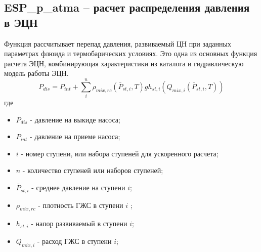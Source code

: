 \subsection{ESP\_p\_atma – расчет распределения давления в ЭЦН}
Функция рассчитывает перепад давления, развиваемый ЦН при заданных параметрах флюида и термобарических условиях. Это одна из основных функция расчета ЭЦН, комбинирующая характеристики из каталога и гидравлическую модель работы ЭЦН.
$$ P_{dis} = P_{int} + \sum_i^n{\rho_{mix,rc}(\bar{P}_{st,i},T) g h_{st,i}(Q_{mix,i}(\bar{P}_{st,i},T))} $$
где 
\begin{itemize}
	\item $P_{dis}$ - давление на выкиде насоса;
	\item $P_{int}$ - давление на приеме насоса;
	\item $i$ - номер ступени, или набора ступеней для ускоренного расчета;
	\item $n$ - количество ступеней или наборов ступеней;
	\item $\bar{P}_{st,i}$ - среднее давление на  ступени $i$;
	\item $\rho_{mix,rc}$ - плотность ГЖС  в ступени $i$ ;
	\item $h_{st,i}$ - напор развиваемый  в ступени $i$;
	\item $Q_{mix,i}$ - расход ГЖС в ступени $i$;
	
\end{itemize}


